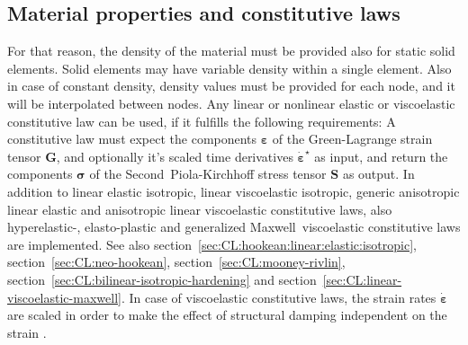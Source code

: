 \subsection{Material properties and constitutive laws}
For that reason, the density of the material must be provided also for static solid elements.
Solid elements may have variable density within a single element.
Also in case of constant density, density values must be provided for each node, and it will be interpolated between nodes.
Any linear or nonlinear elastic or viscoelastic constitutive law can be used, if it fulfills the following requirements:
A constitutive law must expect the components $\boldsymbol{\varepsilon}$ of the Green-Lagrange strain tensor $\boldsymbol{G}$,
and optionally it's scaled time derivatives $\dot{\boldsymbol{\varepsilon}}^{\star}$ as input, and return the components $\boldsymbol{\sigma}$
of the Second~Piola-Kirchhoff stress tensor $\boldsymbol{S}$ as output. In addition to linear elastic isotropic, linear viscoelastic isotropic,
generic anisotropic linear elastic and anisotropic linear viscoelastic constitutive laws, also hyperelastic-, elasto-plastic
and generalized Maxwell~viscoelastic constitutive laws are implemented.
See also section~\ref{sec:CL:hookean:linear:elastic:isotropic}, section~\ref{sec:CL:neo-hookean}, section~\ref{sec:CL:mooney-rivlin},
section~\ref{sec:CL:bilinear-isotropic-hardening} and section~\ref{sec:CL:linear-viscoelastic-maxwell}.
In case of viscoelastic constitutive laws, the strain rates $\dot{\boldsymbol{\varepsilon}}$ are scaled in order to make
the effect of structural damping independent on the strain \cite{KUEBLER2005}.

